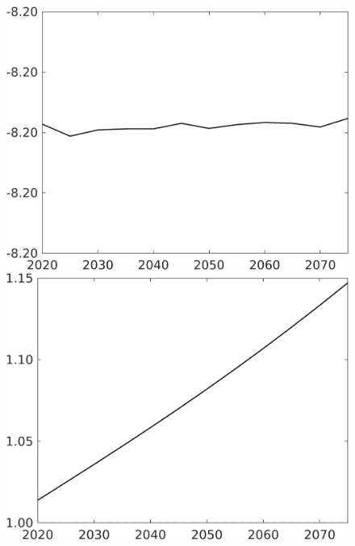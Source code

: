 \documentclass[12pt]{article}
\begin{document}
\begin{figure}[h!!]
\begin{minipage}[]{0.32\textwidth}
	\end{minipage}	
	\begin{minipage}[]{0.32\textwidth}
		\includegraphics[width=1\textwidth]{../../codding_model/own_basedOnFried/optimalPol_010922_revision/figures/all_13Sept22/CompTaul_Equlab_LFBAUPer_Reg0_G_spillover0_nsk1_xgr1_knspil0_sep1_countec0_GovRev0_etaa0.79.png}
	\end{minipage}	
	\begin{minipage}[]{0.32\textwidth}
		\includegraphics[width=1\textwidth]{../../codding_model/own_basedOnFried/optimalPol_010922_revision/figures/all_13Sept22/CompTaul_Equlab_LFBAU_Reg0_lambdaa_spillover0_nsk1_xgr1_knspil0_sep1_countec0_GovRev0_etaa0.79_lgd0.png}

\end{minipage}
\end{figure}
\end{document}
